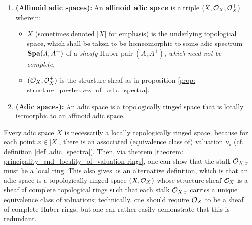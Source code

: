                     \begin{definition} \label{def: adic_spaces}
                        \noindent
                        \begin{enumerate}
                            \item \textbf{(Affinoid adic spaces):} An \textbf{affinoid adic space} is a triple $(X, \mathcal{O}_X, \mathcal{O}_X^+)$ wherein:
                                \begin{itemize}
                                    \item $X$ (sometimes denoted $|X|$ for emphasis) is the underlying topological space, which shall be taken to be homeomorphic to some adic spectrum $\mathbf{Spa}(A, A^+)$ of a \textit{sheafy} Huber pair $(A, A^+)$, \textit{which need not be complete},
                                    \item $(\mathcal{O}_X, \mathcal{O}_X^+)$ is the structure sheaf as in proposition \ref{prop: structure_presheaves_of_adic_spectra}.
                                \end{itemize}
                            \item \textbf{(Adic spaces):} An adic space is a topologically ringed space that is locally isomorphic to an affinoid adic space.
                        \end{enumerate}
                    \end{definition}
                    \begin{remark} \label{remark: adic_spaces_are_locally_ringed}
                        Every adic space $X$ is necessarily a locally topologically ringed space, because for each point $x \in |X|$, there is an associated (equivalence class of) valuation $\nu_x$ (cf. definition \ref{def: adic_spectra}). Then, via theorem \ref{theorem: principality_and_locality_of_valuation rings}, one can show that the stalk $\mathcal{O}_{X, x}$ must be a local ring. This also gives us an alternative definition, which is that an adic space is a topologically ringed space $(X, \mathcal{O}_X)$ whose structure sheaf $\mathcal{O}_X$ is a sheaf of complete topological rings such that each stalk $\mathcal{O}_{X, x}$ carries a unique equivalence class of valuations; technically, one should require $\mathcal{O}_X$ to be a sheaf of complete Huber rings, but one can rather easily demonstrate that this is redundant. 
                    \end{remark}
